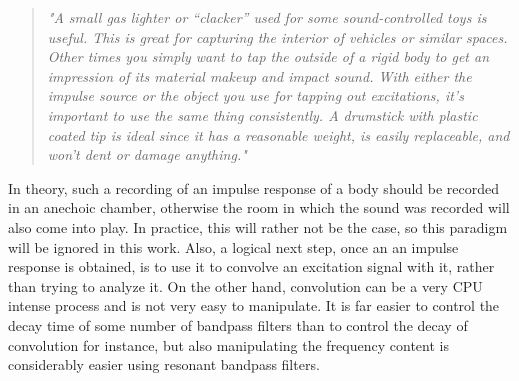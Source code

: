 \begin{quotation}
\textit{"A small gas lighter or “clacker” used for some sound-controlled toys is useful. This is great for capturing the interior of vehicles or similar spaces. Other times you simply want to tap the outside of a rigid body to get an impression of its material makeup and impact sound. With either the impulse source or the object you use for tapping out excitations, it’s important to use the same thing consistently. A drumstick with plastic coated tip is ideal since it has a reasonable weight, is easily replaceable, and won’t dent or damage anything."}
\end{quotation}
\citep[p. 252]{farnell_designing_2010}


In theory, such a recording of an impulse response of a body should be recorded in an anechoic chamber, otherwise the room in which the sound was recorded will also come into play. In practice, this will rather not be the case, so this paradigm will be ignored in this work. Also, a logical next step, once an an impulse response is obtained, is to use it to convolve an excitation signal with it, rather than trying to analyze it. On the other hand, convolution can be a very CPU intense process and is not very easy to manipulate. It is far easier to control the decay time of some number of bandpass filters than to control the decay of convolution for instance, but also manipulating the frequency content is considerably easier using resonant bandpass filters.\

